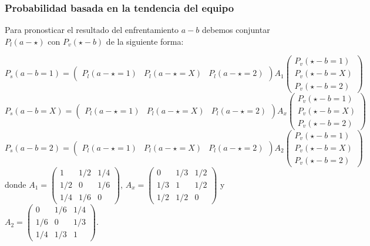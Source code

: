 \documentclass{beamer}
\begin{document}
	\begin{frame}
		\frametitle{Probabilidad basada en la tendencia del equipo}	
		Para pronosticar el resultado del enfrentamiento $a-b$ debemos conjuntar $P_{l}(a - \star)$ con $P_{v}(\star - b)$ de la siguiente forma:
		
	{\tiny $$P_{s}(a-b=1)=
		\left(\begin{array}{ccc}
		P_{l}(a - \star=1) & P_{l}(a - \star=X) & P_{l}(a - \star=2)
		\end{array} \right)
		A_{1}
		\left(\begin{array}{c}
		P_{v}(\star - b=1)\\
		P_{v}(\star - b=X)\\
		P_{v}(\star - b=2)
		\end{array} \right)
		$$	
		$$P_{s}(a-b=X)=
		\left(\begin{array}{ccc}
		P_{l}(a - \star=1) & P_{l}(a - \star=X) & P_{l}(a - \star=2)
		\end{array} \right)
		A_{x}
		\left(\begin{array}{c}
		P_{v}(\star - b=1)\\
		P_{v}(\star - b=X)\\
		P_{v}(\star - b=2)
		\end{array} \right)
		$$
		$$P_{s}(a-b=2)=
		\left(\begin{array}{ccc}
		P_{l}(a - \star=1) & P_{l}(a - \star=X) & P_{l}(a - \star=2)
		\end{array} \right)
		A_{2}
		\left(\begin{array}{c}
		P_{v}(\star - b=1)\\
		P_{v}(\star - b=X)\\
		P_{v}(\star - b=2)
		\end{array} \right)$$
		donde
		$A_{1}=\left(\begin{array}{ccc}
		1 & 1/2 & 1/4\\
		1/2 & 0 & 1/6\\
		1/4 & 1/6 & 0
		\end{array} \right)$,
		$A_{x}=\left(\begin{array}{ccc}
		0 & 1/3 & 1/2\\
		1/3 & 1 & 1/2\\
		1/2 & 1/2 & 0
		\end{array} \right)$ y
		$A_{2}=\left(\begin{array}{ccc}
		0 & 1/6 & 1/4\\
		1/6 & 0 & 1/3\\
		1/4 & 1/3 & 1
		\end{array} \right)$.
		}
	\end{frame}
	
\end{document}
